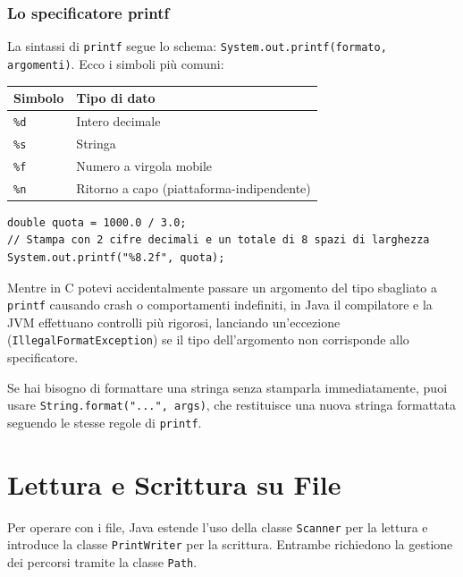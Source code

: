 \subsubsection*{Lo specificatore printf}

La sintassi di \texttt{printf} segue lo schema: \texttt{System.out.printf(formato, argomenti)}. Ecco i simboli più comuni:

\begin{table}[ht!]
\centering
\begin{tabular}{ll}
\toprule
\textbf{Simbolo} & \textbf{Tipo di dato} \\ \midrule
\texttt{\%d} & Intero decimale \\
\texttt{\%s} & Stringa \\
\texttt{\%f} & Numero a virgola mobile \\
\texttt{\%n} & Ritorno a capo (piattaforma-indipendente) \\ \bottomrule
\end{tabular}
\end{table}

\begin{lstlisting}[caption={Esempio di output formattato}]
double quota = 1000.0 / 3.0;
// Stampa con 2 cifre decimali e un totale di 8 spazi di larghezza
System.out.printf("%8.2f", quota); 
\end{lstlisting}

\begin{observation}
Mentre in C potevi accidentalmente passare un argomento del tipo sbagliato a \texttt{printf} causando crash o comportamenti indefiniti, in Java il compilatore e la JVM effettuano controlli più rigorosi, lanciando un'eccezione (\texttt{IllegalFormatException}) se il tipo dell'argomento non corrisponde allo specificatore.
\end{observation}

\begin{tip}[]
    Se hai bisogno di formattare una stringa senza stamparla immediatamente, puoi usare \texttt{String.format("...", args)}, che restituisce una nuova stringa formattata seguendo le stesse regole di \texttt{printf}.
\end{tip}

\section{Lettura e Scrittura su File}

Per operare con i file, Java estende l'uso della classe \texttt{Scanner} per la lettura e introduce la classe \texttt{PrintWriter} per la scrittura. Entrambe richiedono la gestione dei percorsi tramite la classe \texttt{Path}.

